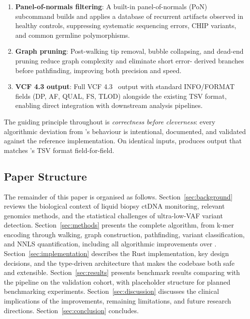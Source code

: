 \begin{enumerate}
  \item \textbf{Panel-of-normals filtering}: A built-in panel-of-normals (PoN)
    subcommand builds and applies a database of recurrent artifacts observed in
    healthy controls, suppressing systematic sequencing errors, CHIP variants,
    and common germline polymorphisms.

  \item \textbf{Graph pruning}: Post-walking tip removal, bubble collapsing,
    and dead-end pruning reduce graph complexity and eliminate short error-
    derived branches before pathfinding, improving both precision and speed.

  \item \textbf{VCF 4.3 output}: Full VCF 4.3~\cite{vcfspec} output with
    standard INFO/FORMAT fields (DP, AF, QUAL, FS, TLOD) alongside the
    existing TSV format, enabling direct integration with downstream analysis
    pipelines.

\end{enumerate}

The guiding principle throughout is \emph{correctness before cleverness}: every
algorithmic deviation from \km{}'s behaviour is intentional, documented, and
validated against the reference implementation.  On identical inputs, \kmerdet{}
produces output that matches \km{}'s TSV format field-for-field.

\subsection{Paper Structure}

The remainder of this paper is organised as follows.
Section~\ref{sec:background} reviews the biological context of liquid biopsy
ctDNA monitoring, relevant genomics methods, and the statistical challenges of
ultra-low-VAF variant detection.
Section~\ref{sec:methods} presents the complete \kmerdet{} algorithm, from
k-mer encoding through walking, graph construction, pathfinding, variant
classification, and NNLS quantification, including all algorithmic improvements
over \km{}.
Section~\ref{sec:implementation} describes the Rust implementation, key design
decisions, and the type-driven architecture that makes the codebase both safe
and extensible.
Section~\ref{sec:results} presents benchmark results comparing \kmerdet{} with
the \kam{} pipeline on the validation cohort, with placeholder structure for
planned benchmarking experiments.
Section~\ref{sec:discussion} discusses the clinical implications of the
improvements, remaining limitations, and future research directions.
Section~\ref{sec:conclusion} concludes.
